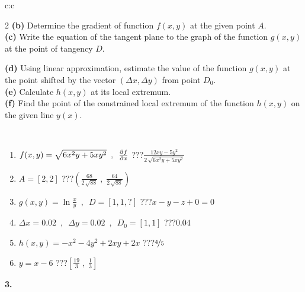 \documentclass[10pt]{report}
\begin{document}
\begin{tabular}{c:c}
\begin{minipage}[c][104.5mm][t]{0.5\linewidth}
\begin{center}
\begin{minipage}{0.95\linewidth}
\begin{center}
{\begin{multicols}{2}
\textbf{(b)} Determine the gradient of function \(f(x,y)\) at the given point \(A\). \\[1mm]
\textbf{(c)} Write the equation of the tangent plane to the graph of the function \(g(x,y)\) at the point of tangency \(D\). \par \columnbreak
\textbf{(d)} Using linear approximation, estimate the value of the function \(g(x,y)\) at the point shifted by the vector \((\Delta x, \Delta y)\) from point \(D_0\). \\[1mm]
\textbf{(e)} Calculate \(h(x,y)\) at its local extremum. \\[1mm]
\textbf{(f)} Find the point of the constrained local extremum of the function \(h(x,y)\) on the given line \(y(x)\). \\[1mm]
\end{multicols}
}
\end{center}
\end{minipage}
\\[4mm]
\begin{minipage}{0.79\linewidth}
\begin{center}
\begin{varwidth}{\linewidth}
\begin{enumerate}
\normalsizerr
\item $f(x,y) = \sqrt{6x^2y + 5xy^2}\enspace , \enspace \pdv{f}{x}$\quad \dotfill\; ???\;\dotfill \quad $\frac{12xy-5y^2}{2\,\sqrt{6x^2y+5xy^2}}$
\item $A = [2, 2]$\quad \dotfill\; ???\;\dotfill \quad $\left( \frac{68}{2\,\sqrt{88}} \;,\; \frac{64}{2\,\sqrt{88}} \right)$
\item $g(x,y) = \ln\frac{x}{y} \enspace , \enspace D=[1,1,?]$\quad \dotfill\; ???\;\dotfill \quad $x - y - z + 0 = 0$
\item $\Delta x = {0.02} \enspace,\enspace \Delta y = {0.02} \enspace,\enspace D_0 = [1,1]$\quad \dotfill\; ???\;\dotfill \quad $0.04$
\item $h(x,y) = -x^2-4y^2+2xy+2x$\quad \dotfill\; ???\;\dotfill \quad $\nicefrac{4}{5}$
\item $y = x-6$\quad \dotfill\; ???\;\dotfill \quad $\left[\frac{19}{3}\;,\;\frac{1}{3}\right]$
\end{enumerate}
\end{varwidth}
\end{center}
\end{minipage}
\begin{minipage}{0.20\linewidth}
\begin{center}
{\Huge\bfseries 3.} \\[2mm]

\end{center}
\end{minipage}
\end{center}
\end{minipage}
\end{tabular}
\end{document}

